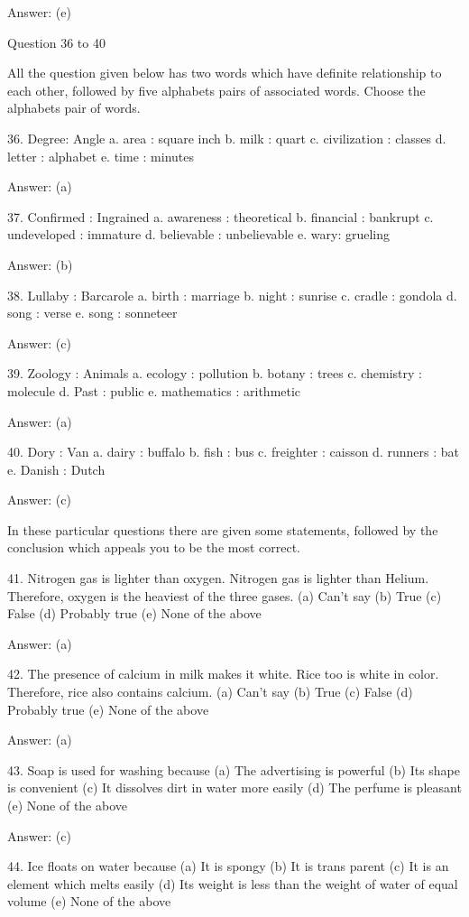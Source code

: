 Answer: (e)



Question 36 to 40

All the question given below has two words which have definite relationship to each other, followed by five alphabets pairs of associated words. Choose the alphabets pair of words.

36. Degree: Angle
a. area : square inch
b. milk : quart
c. civilization : classes
d. letter : alphabet
e. time : minutes

Answer: (a)

37. Confirmed : Ingrained
a. awareness : theoretical
b. financial : bankrupt
c. undeveloped : immature
d. believable : unbelievable
e. wary: grueling

Answer: (b)

38. Lullaby : Barcarole
a. birth : marriage
b. night : sunrise
c. cradle : gondola
d. song : verse
e. song : sonneteer

Answer: (c)

39. Zoology : Animals
a. ecology : pollution
b. botany : trees
c. chemistry : molecule
d. Past : public
e. mathematics : arithmetic

Answer: (a)

40. Dory : Van
a. dairy : buffalo
b. fish : bus
c. freighter : caisson
d. runners : bat
e. Danish : Dutch

Answer: (c)


In these particular questions there are given some statements, followed by the conclusion which appeals you to be the most correct.

41. Nitrogen gas is lighter than oxygen. Nitrogen gas is lighter than Helium. Therefore, oxygen is the heaviest of the three gases.
(a) Can’t say
(b) True
(c) False
(d) Probably true
(e) None of the above

Answer: (a)

42. The presence of calcium in milk makes it white. Rice too is white in color. Therefore, rice also contains calcium.
(a) Can’t say
(b) True
(c) False
(d) Probably true
(e) None of the above

Answer: (a)

43. Soap is used for washing because
(a) The advertising is powerful
(b) Its shape is convenient
(c) It dissolves dirt in water more easily
(d) The perfume is pleasant
(e) None of the above

Answer: (c)

44. Ice floats on water because
(a) It is spongy
(b) It is trans parent
(c) It is an element which melts easily
(d) Its weight is less than the weight of water of equal volume
(e) None of the above

